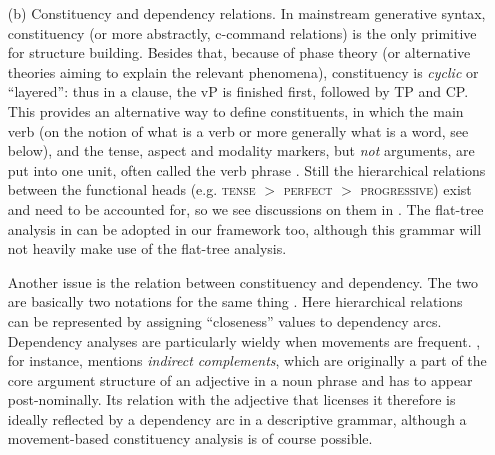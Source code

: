 \documentclass[UTF8, a4paper, oneside, scheme=plain, 12pt]{ctexrep}
\newcommand*{\citepage}[1]{p.~{#1}}
\newcommand*{\citepages}[1]{pp.~{#1}}
\newcommand*{\textgt}{$>$ }
\newcommand*{\term}[1]{\emph{#1}}
\newcommand*{\category}[1]{\textsc{#1}}
\begin{document}
{\begin{itemize}
    This traditional usage of the term \term{head} appears in the generative literature as well:
    \citet[\citepage{120}]{paul2014new}, for instance, talks about the \term{head noun} of something he calls a DP.
    The two definitions of \term{head} overlap when there is grammaticalization:
    a so-called prepositional phrase can be a argument-taking adverb phrase
    in which the \term{head preposition} is a head in the traditional sense,
    or an analytic case phrase, where the \term{head preposition} is actually a case particle and a functional head.
    The former can be reanalyzed as the latter.
    On the other hand, some functional heads, like sentence final particles
    (see e.g. ),
    are never recognized as heads in traditional grammars:
    they are instead called \term{markers} in grammars like \citet{cgel}.

    \item[(b)] Constituency and dependency relations.
    In mainstream generative syntax, constituency (or more abstractly, c-command relations) is the only primitive for structure building.
    Besides that, because of phase theory (or alternative theories aiming to explain the relevant phenomena),
    constituency is \term{cyclic} or ``layered'':
    thus in a clause, the vP is finished first, followed by TP and CP.
    This provides an alternative way to define constituents,
    in which the main verb (on the notion of what is a verb or more generally what is a word, see below),
    and the tense, aspect and modality markers, but \emph{not} arguments, are put into one unit,
    often called the verb phrase \citep[\citepage{39}]{quirk1985}.
    Still the hierarchical relations between the functional heads 
    (e.g. \category{tense} \textgt{}\category{perfect} \textgt{}\category{progressive})
    exist and need to be accounted for, so we see discussions on them in \citet[\citepages{79,121}]{quirk1985}.
    The flat-tree analysis in \citet[\citepage{39}]{quirk1985} can be adopted in our framework too,
    although this grammar will not heavily make use of the flat-tree analysis.
    
    Another issue is the relation between constituency and dependency.
    The two are basically two notations for the same thing \citep{boston2009dependency}.
    Here hierarchical relations can be represented by assigning ``closeness'' values to dependency arcs.
    Dependency analyses are particularly wieldy when movements are frequent.
    \citet[\citepage{55}]{cgel}, for instance, mentions \term{indirect complements},
    which are originally a part of the core argument structure of an adjective
    in a noun phrase and has to appear post-nominally.
    Its relation with the adjective that licenses it therefore is ideally reflected 
    by a dependency arc in a descriptive grammar,
    although a movement-based constituency analysis is of course possible.
    

\end{itemize}}
\end{document}
